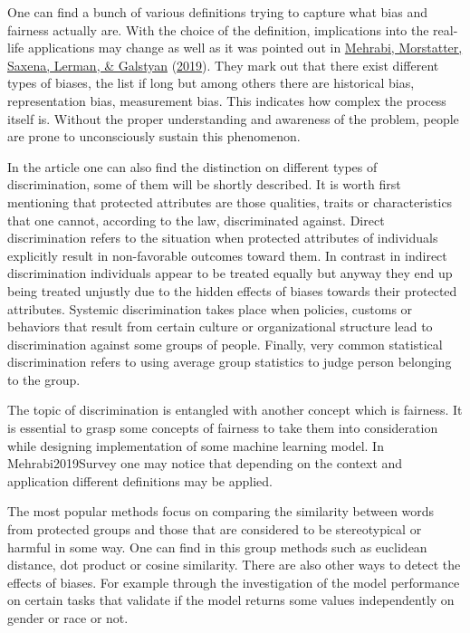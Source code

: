 \documentclass[
  12pt,
]{book}
\begin{document}
One can find a bunch of various definitions trying to capture what bias and fairness actually are. With the choice of the definition, implications into the real-life applications may change as well as it was pointed out in \protect\hyperlink{ref-Mehrabi2019Survey}{Mehrabi, Morstatter, Saxena, Lerman, \& Galstyan} (\protect\hyperlink{ref-Mehrabi2019Survey}{2019}). They mark out that there exist different types of biases, the list if long but among others there are historical bias, representation bias, measurement bias. This indicates how complex the process itself is. Without the proper understanding and awareness of the problem, people are prone to unconsciously sustain this phenomenon.

In the article one can also find the distinction on different types of discrimination, some of them will be shortly described. It is worth first mentioning that protected attributes are those qualities, traits or characteristics that one cannot, according to the law, discriminated against.
Direct discrimination refers to the situation when protected attributes of individuals explicitly result in non-favorable outcomes toward them. In contrast in indirect discrimination individuals appear to be treated equally but anyway they end up being treated unjustly due to the hidden effects of biases towards their protected attributes. Systemic discrimination takes place when policies, customs or behaviors that result from certain culture or organizational structure lead to discrimination against some groups of people. Finally, very common statistical discrimination refers to using
average group statistics to judge person belonging to the group.

The topic of discrimination is entangled with another concept which is fairness. It is essential to grasp some concepts of fairness to take them into
consideration while designing implementation of some machine learning model. In Mehrabi2019Survey one may notice that depending on the context and application different definitions may be applied.

The most popular methods focus on comparing the similarity between words from protected groups and those that are considered to be stereotypical or harmful in some way. One can find in this group methods such as euclidean distance, dot product or cosine similarity. There are also other ways to detect the effects of biases. For example through the investigation of the model performance on certain tasks that validate if the model returns some values
independently on gender or race or not.
\end{document}
